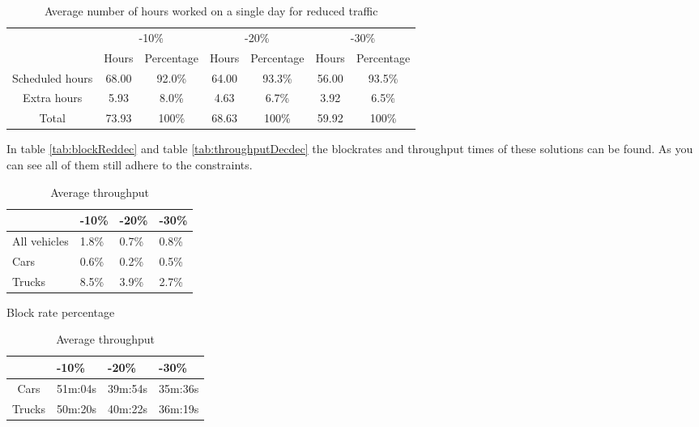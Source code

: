 \begin{table}[h!]
	\centering
	\begin{tabular}{c|c|c|c|c|c|c|}
		\cline{2-7}
		& \multicolumn{2}{c|}{-10\%} & \multicolumn{2}{c|}{-20\%} & \multicolumn{2}{c|}{-30\%} \\ \cline{2-7} 
		& Hours     & Percentage     & Hours     & Percentage     & Hours     & Percentage     \\ \hline
		\multicolumn{1}{|c|}{Scheduled hours} & 68.00     & 92.0\%         & 64.00     & 93.3\%         & 56.00     & 93.5\%         \\ \hline
		\multicolumn{1}{|c|}{Extra hours}     & 5.93      & 8.0\%          & 4.63      & 6.7\%          & 3.92      & 6.5\%          \\ \hline
		\multicolumn{1}{|c|}{Total}           & 73.93     & 100\%          & 68.63     & 100\%          & 59.92     & 100\%          \\ \hline
	\end{tabular}
	\caption{Average number of hours worked on a single day for reduced traffic}
	\label{tab:costsdec}
\end{table}
\newpage
In table \autoref{tab:blockReddec} and table \autoref{tab:throughputDecdec} the blockrates and throughput times of these solutions can be found. As you can see all of them still adhere to the constraints.
\begin{table}
	\centering
	\begin{minipage}{.5\linewidth}
	\begin{tabular}{l|l|l|l|}
		\cline{2-4}
		& -10\% & -20\% & -30\% \\ \hline
		\multicolumn{1}{|l|}{All vehicles} & 1.8\% & 0.7\% & 0.8\% \\ \hline
		\multicolumn{1}{|l|}{Cars}         & 0.6\% & 0.2\% & 0.5\% \\ \hline
		\multicolumn{1}{|l|}{Trucks}       & 8.5\% & 3.9\% & 2.7\% \\ \hline
	\end{tabular}
	\caption{Block rate percentage}
	\label{tab:blockReddec}
	\end{minipage}%
	\begin{minipage}{.5\linewidth}
	\centering
	\begin{tabular}{c|c|c|c|}
		\cline{2-4}
		\multicolumn{1}{l|}{}        & \multicolumn{1}{l|}{-10\%} & \multicolumn{1}{l|}{-20\%} & \multicolumn{1}{l|}{-30\%} \\ \hline
		\multicolumn{1}{|c|}{Cars}   & 51m:04s                    & 39m:54s                    & 35m:36s                    \\ \hline
		\multicolumn{1}{|c|}{Trucks} & 50m:20s                    & 40m:22s                    & 36m:19s                    \\ \hline
	\end{tabular}
	\caption{Average throughput}
	\label{tab:throughputDecdec}
	\end{minipage}
\end{table}
